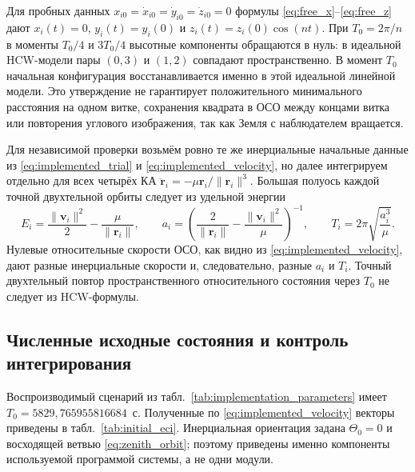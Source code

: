 \documentclass[a4paper,12pt]{article}
\begin{document}
Для пробных данных $x_{i0}=\dot x_{i0}=
\dot y_{i0}=\dot z_{i0}=0$ формулы
\eqref{eq:free_x}--\eqref{eq:free_z} дают
$x_i(t)=0$, $y_i(t)=y_i(0)$ и
$z_i(t)=z_i(0)\cos(nt)$.
При $T_0=2\pi/n$ в моменты $T_0/4$ и
$3T_0/4$ высотные компоненты обращаются в нуль:
в идеальной HCW-модели пары $(0,3)$ и $(1,2)$
совпадают пространственно. В момент $T_0$
начальная конфигурация восстанавливается
именно в этой идеальной линейной модели.
Это утверждение не гарантирует положительного
минимального расстояния на одном витке,
сохранения квадрата в ОСО между концами витка
или повторения углового изображения, так как
Земля с наблюдателем вращается.

Для независимой проверки возьмём ровно те же
инерциальные начальные данные из
\eqref{eq:implemented_trial} и
\eqref{eq:implemented_velocity}, но далее интегрируем
отдельно для всех четырёх КА
$\ddot{\mathbf r}_i=-\mu\mathbf r_i/\|\mathbf r_i\|^3$.
Большая полуось каждой точной двухтельной орбиты
следует из удельной энергии
\begin{equation}
E_i=\frac{\|\mathbf v_i\|^2}{2}
       -\frac{\mu}{\|\mathbf r_i\|},\qquad
a_i=\left(\frac{2}{\|\mathbf r_i\|}
       -\frac{\|\mathbf v_i\|^2}{\mu}\right)^{-1},
\qquad T_i=2\pi\sqrt{\frac{a_i^3}{\mu}}.
\label{eq:two_body_energy_period}
\end{equation}
Нулевые относительные скорости ОСО, как видно из
\eqref{eq:implemented_velocity}, дают разные
инерциальные скорости и, следовательно, разные
$a_i$ и $T_i$. Точный двухтельный повтор
пространственного относительного состояния через
$T_0$ не следует из HCW-формулы.

\subsection{Численные исходные состояния и контроль интегрирования}

Воспроизводимый сценарий из табл.~\ref{tab:implementation_parameters}
имеет $T_0=5829{,}765955816684$~с.
Полученные по \eqref{eq:implemented_velocity} векторы
приведены в табл.~\ref{tab:initial_eci}. Инерциальная
ориентация задана $\Theta_0=0$ и восходящей ветвью
\eqref{eq:zenith_orbit}; поэтому приведены именно компоненты
используемой программой системы, а не одни модули.
\end{document}
